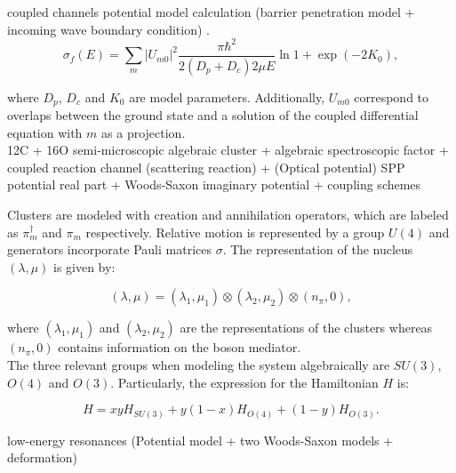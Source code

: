 \documentclass[openany]{book}
\begin{document}
coupled channels potential model calculation (barrier penetration model + incoming wave boundary condition) \cite{guimin_deji_xiaowu_1992}. \\

\begin{equation}\label{eq:middleFusion_fusionCrossSection}
	\sigma_f(E) = \sum_{m} {|U_{m0}|^2 \frac{\pi \hbar^2}{2(D_p + D_c)2\mu E} \ln {1 + \exp {(-2K_0)}} },
\end{equation}

where $D_p$, $D_c$ and $K_0$ are model parameters. Additionally, $U_{m0}$ correspond to overlaps between the ground state and a solution of the coupled differential equation with $m$ as a projection.\\

12C + 16O semi-microscopic algebraic cluster  + algebraic spectroscopic factor + coupled reaction channel (scattering reaction) + (Optical potential) SPP potential real part + Woods-Saxon imaginary potential + coupling schemes  \cite{ferreira_lubian_linares_ermamatov_yepez-martinez_hess_2019}

Clusters are modeled with creation and annihilation operators, which are labeled as $\pi^{\dagger}_m$ and $\pi_m$ respectively. Relative motion is represented by a group $U(4)$ and generators incorporate Pauli matrices $\sigma$. The representation of the nucleus $(\lambda, \mu)$ is given by:

\begin{equation}\label{eq:middleFusion_algebraic_representation}
	(\lambda, \mu) = (\lambda_1, \mu_1) \otimes  (\lambda_2, \mu_2) \otimes (n_\pi, 0),
\end{equation}

where $(\lambda_1, \mu_1)$ and $(\lambda_2, \mu_2)$ are the representations of the clusters whereas $ (n_\pi, 0)$ contains information on the boson mediator. \\

The three relevant groups when modeling the system algebraically are $SU(3)$, $O(4)$ and $O(3)$. Particularly, the expression for the Hamiltonian $H$ is: 

\begin{equation}\label{eq:middleFusion_algebraic_hamiltonian}
	H = xyH_{SU(3)} + y(1-x)H_{O(4)} + (1-y)H_{O(3)}.
\end{equation}

low-energy resonances (Potential model + two Woods-Saxon models + deformation) \cite{torilov_maltsev_zherebchevsky_2021} \\
\end{document}
